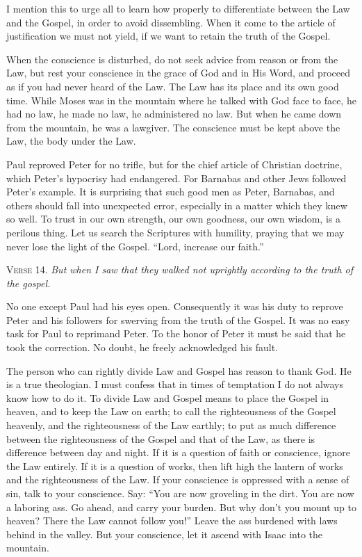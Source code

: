 I mention this to urge all to learn how properly to differentiate between the Law and the Gospel, in order to avoid dissembling. When it come to the article of justification we must not yield, if we want to retain the truth of the Gospel.

When the conscience is disturbed, do not seek advice from reason or from the Law, but rest your conscience in the grace of God and in His Word, and proceed as if you had never heard of the Law. The Law has its place and its own good time. While Moses was in the mountain where he talked with God face to face, he had no law, he made no law, he administered no law. But when he came down from the mountain, he was a lawgiver. The conscience must be kept above the Law, the body under the Law.

Paul reproved Peter for no trifle, but for the chief article of Christian doctrine, which Peter’s hypocrisy had endangered. For Barnabas and other Jews followed Peter’s example. It is surprising that such good men as Peter, Barnabas, and others should fall into unexpected error, especially in a matter which they knew so well. To trust in our own strength, our own goodness, our own wisdom, is a perilous thing. Let us search the Scriptures with humility, praying that we may never lose the light of the Gospel. “Lord, increase our faith.”

\textsc{Verse} 14. \emph{But when I saw that they walked not uprightly according to the truth of the gospel.}

No one except Paul had his eyes open. Consequently it was his duty to reprove Peter and his followers for swerving from the truth of the Gospel. It was no easy task for Paul to reprimand Peter. To the honor of Peter it must be said that he took the correction. No doubt, he freely acknowledged his fault.

The person who can rightly divide Law and Gospel has reason to thank God. He is a true theologian. I must confess that in times of temptation I do not always know how to do it. To divide Law and Gospel means to place the Gospel in heaven, and to keep the Law on earth; to call the righteousness of the Gospel heavenly, and the righteousness of the Law earthly; to put as much difference between the righteousness of the Gospel and that of the Law, as there is difference between day and night. If it is a question of faith or conscience, ignore the Law entirely. If it is a question of works, then lift high the lantern of works and the righteousness of the Law. If your conscience is oppressed with a sense of sin, talk to your conscience. Say: “You are now groveling in the dirt. You are now a laboring ass. Go ahead, and carry your burden. But why don’t you mount up to heaven? There the Law cannot follow you!” Leave the ass burdened with laws behind in the valley. But your conscience, let it ascend with Isaac into the mountain.

